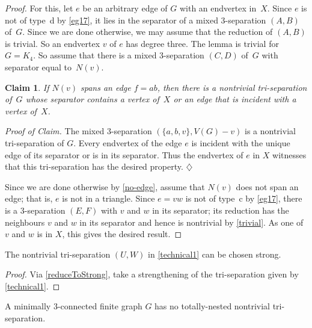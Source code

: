 \documentclass{aic}
\newenvironment{cproof}{\noindent\textit{Proof of Claim.}}{\phantom{!}\!\hfill$\diamondsuit$}
\theoremstyle{plain}
\newtheorem{sublem}{Claim}[thm]
\theoremstyle{definition}
\theoremstyle{plain}
\theoremstyle{plain}
\begin{document}
\begin{proof}
    For this, let $e$ be an arbitrary edge of $G$ with an endvertex in~$X$. Since $e$ is not of type~d by \autoref{eg17}, it lies in the separator of a mixed 3-separation $(A,B)$ of~$G$.
    Since we are done otherwise, we may assume that the reduction of $(A,B)$ is trivial. 
    So an endvertex $v$ of $e$ has degree three. 
    The lemma is trivial for $G=K_4$. 
    So assume that there is a mixed 3-separation $(C,D)$ of~$G$ with separator equal to~$N(v)$.
\begin{sublem}\label{no-edge}
   If $N(v)$ spans an edge  $f=ab$, then there is a nontrivial tri-separation of~$G$ whose separator contains a vertex of~$X$ or an edge that is incident with a vertex of~$X$.
\end{sublem}
\begin{cproof}
    The mixed 3-separation $(\{a,b,v\},V(G)-v)$ is a nontrivial tri-separation of $G$.
    Every endvertex of the edge $e$ is incident with the unique edge of its separator or is in its separator. Thus the endvertex of $e$ in $X$ witnesses that this tri-separation has the desired property. 
\end{cproof}

    Since we are done otherwise by \autoref{no-edge}, assume that $N(v)$ does not span an edge; that is, $e$ is not in a triangle. 
    Since $e=vw$ is not of type~c by \autoref{eg17}, there is a 3-separation $(E,F)$ with $v$ and $w$ in its separator; its reduction 
    has the neighbours $v$ and $w$ in its separator and hence is nontrivial by \autoref{trivial}. 
    As one of $v$ and $w$ is in $X$, this gives the desired result.
\end{proof}
\begin{obs}\label{technical2}
The nontrivial tri-separation $(U,W)$ in \autoref{technical1} can be chosen strong.
\end{obs}
\begin{proof}
Via \autoref{reduceToStrong}, take a strengthening of the tri-separation given by \autoref{technical1}. 
\end{proof}

\begin{lem}\label{no-sep}
    A minimally 3-connected finite graph $G$ has no totally-nested nontrivial tri-separation.
\end{lem}
\end{document}
